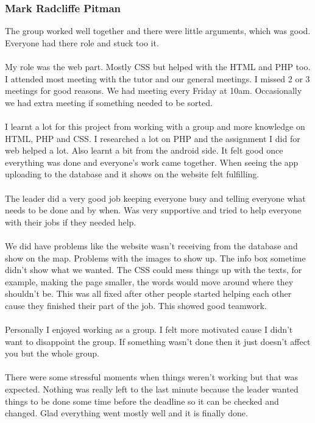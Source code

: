 \documentclass[12pt, portrait]{article}
\begin{document}
\subsubsection{Mark Radcliffe Pitman}
The group worked well together and there were little arguments, which was good. Everyone had there role and stuck too it. ~\\\\
My role was the web part. Mostly CSS but helped with the HTML and PHP too. I attended most meeting with the tutor and our general meetings. I missed 2 or 3 meetings for good reasons.  We had meeting every Friday at 10am. Occasionally we had extra meeting if something needed to be sorted. ~\\\\
I learnt a lot for this project from working with a group and more knowledge on HTML, PHP and CSS. I researched a lot on PHP and the assignment I did for web helped a lot. Also learnt a bit from the android side. It felt good once everything was done and everyone’s work came together. When seeing the app uploading to the database and it shows on the website felt fulfilling.  ~\\\\
The leader did a very good job keeping everyone busy and telling everyone what needs to be done and by when. Was very supportive and tried to help everyone with their jobs if they needed help.~\\\\
We did have problems like the website wasn’t receiving from the database and show on the map. Problems with the images to show up. The info box sometime didn’t show what we wanted. The CSS could mess things up with the texts, for example, making the page smaller, the words would move around where they shouldn’t be. This was all fixed after other people started helping each other cause they finished their part of the job. This showed good teamwork. ~\\\\
Personally I enjoyed working as a group. I felt more motivated cause I didn’t want to disappoint the group. If something wasn’t done then it just doesn’t affect you but the whole group.~\\\\
 There were some stressful moments when things weren’t working but that was expected. Nothing was really left to the last minute because the leader wanted things to be done some time before the deadline so it can be checked and changed. Glad everything went mostly well and it is finally done.
\newpage
\end{document}
